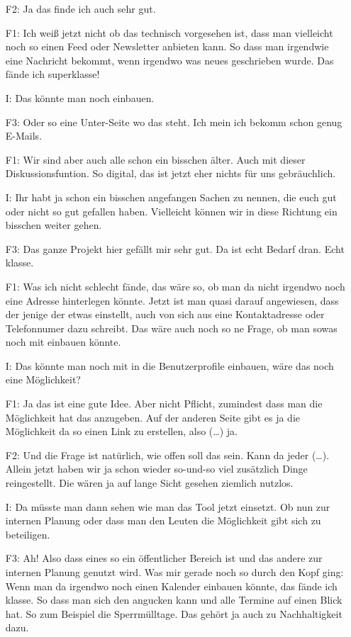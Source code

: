 \begin{itemize}
    \item[F2:] Ja das finde ich auch sehr gut.
    \item[F1:] Ich wei{\ss} jetzt nicht ob das technisch vorgesehen ist, dass man vielleicht noch so einen Feed oder Newsletter anbieten kann. So dass man irgendwie eine Nachricht bekommt, wenn irgendwo was neues geschrieben wurde. Das f{\"a}nde ich superklasse!
    \item[I:] Das k{\"o}nnte man noch einbauen.
    \item[F3:] Oder so eine Unter-Seite wo das steht. Ich mein ich bekomm schon genug E-Mails.
    \item[F1:] Wir sind aber auch alle schon ein bisschen {\"a}lter. Auch mit dieser Diskussionsfuntion. So digital, das ist jetzt eher nichts f{\"u}r uns gebr{\"a}uchlich.
    \item[I:] Ihr habt ja schon ein bisschen angefangen Sachen zu nennen, die euch gut oder nicht so gut gefallen haben. Vielleicht k{\"o}nnen wir in diese Richtung ein bisschen weiter gehen.
    \item[F3:] Das ganze Projekt hier gef{\"a}llt mir sehr gut. Da ist echt Bedarf dran. Echt klasse.
    \item[F1:] Was ich nicht schlecht f{\"a}nde, das w{\"a}re so, ob man da nicht irgendwo noch eine Adresse hinterlegen k{\"o}nnte. Jetzt ist man quasi darauf angewiesen, dass der jenige der etwas einstellt, auch von sich aus eine Kontaktadresse oder Telefonnumer dazu schreibt. Das w{\"a}re auch noch so ne Frage, ob man sowas noch mit einbauen k{\"o}nnte.
    \item[I:] Das k{\"o}nnte man noch mit in die Benutzerprofile einbauen, w{\"a}re das noch eine M{\"o}glichkeit?
    \item[F1:] Ja das ist eine gute Idee. Aber nicht Pflicht, zumindest dass man die M{\"o}glichkeit hat das anzugeben. Auf der anderen Seite gibt es ja die M{\"o}glichkeit da so einen Link zu erstellen, also (\dots) ja.
    \item[F2:] Und die Frage ist nat{\"u}rlich, wie offen soll das sein. Kann da jeder (\dots). Allein jetzt haben wir ja schon wieder so-und-so viel zus{\"a}tzlich Dinge reingestellt. Die w{\"a}ren ja auf lange Sicht gesehen ziemlich nutzlos.
    \item[I:] Da m{\"u}sste man dann sehen wie man das Tool jetzt einsetzt. Ob nun zur internen Planung oder dass man den Leuten die M{\"o}glichkeit gibt sich zu beteiligen.
    \item[F3:] Ah! Also dass eines so ein {\"o}ffentlicher Bereich ist und das andere zur internen Planung genutzt wird. Was mir gerade noch so durch den Kopf ging: Wenn man da irgendwo noch einen Kalender einbauen k{\"o}nnte, das f{\"a}nde ich klasse. So dass man sich den angucken kann und alle Termine auf einen Blick hat. So zum Beispiel die Sperrm{\"u}lltage. Das geh{\"o}rt ja auch zu Nachhaltigkeit dazu.

\end{itemize}

